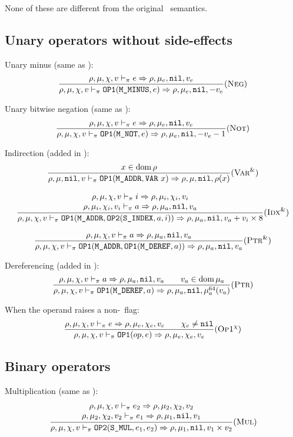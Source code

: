 None of these are different from the original \Cmm\ semantics.

\subsection{Unary operators without side-effects}
Unary minus (same as \Cmm):
\[\dfrac{
    \rho,\mu,\chi,v \vdash_\pi e \Rightarrow \rho,\mu_e,\texttt{nil},v_e
}{\rho,\mu,\chi,v \vdash_\pi \texttt{OP1}(\texttt{M\_MINUS}, e) \Rightarrow \rho,\mu_e,\texttt{nil},-v_e}(\textsc{Neg})\]

Unary bitwise negation (same as \Cmm):
\[\dfrac{
    \rho,\mu,\chi,v \vdash_\pi e\Rightarrow \rho,\mu_e,\texttt{nil},v_e
}{\rho,\mu,\chi,v \vdash_\pi \texttt{OP1}(\texttt{M\_NOT}, e) \Rightarrow \rho,\mu_e,\texttt{nil},-v_e-1}(\textsc{Not})\]


Indirection (added in \Cmp):
\[\dfrac{
    x\in\operatorname{dom}\rho
}{\rho,\mu,\texttt{nil},v \vdash_\pi \texttt{OP1}(\texttt{M\_ADDR}, \texttt{VAR}\ x)\Rightarrow \rho,\mu,\texttt{nil},\rho(x)}(\textsc{Var}^\&)\]

\[\dfrac{\begin{array}{c}
    \rho,\mu,\chi,v \vdash_\pi i\Rightarrow \rho,\mu_i,\chi_i,v_i \\
    \rho,\mu_i,\chi_i,v_i \vdash_\pi a\Rightarrow \rho,\mu_a,\texttt{nil},v_a \\
\end{array}}{\rho,\mu,\chi,v \vdash_\pi \texttt{OP1}(\texttt{M\_ADDR}, \texttt{OP2}(\texttt{S\_INDEX}, a, i)) \Rightarrow \rho,\mu_a,\texttt{nil},v_a+v_i\times 8}(\textsc{Idx}^\&)\]

\[\dfrac{
    \rho,\mu,\chi,v \vdash_\pi a \Rightarrow \rho,\mu_a,\texttt{nil},v_a
}{\rho,\mu,\chi,v \vdash_\pi \texttt{OP1}(\texttt{M\_ADDR}, \texttt{OP1}(\texttt{M\_DEREF}, a)) \Rightarrow \rho,\mu_a,\texttt{nil},v_a}(\textsc{Ptr}^\&)\]

Dereferencing (added in \Cmp):
\[\dfrac{
    \rho,\mu,\chi,v \vdash_\pi a\Rightarrow \rho,\mu_a,\texttt{nil},v_a \qquad v_a\in\operatorname{dom}\mu_a
}{\rho,\mu,\chi,v \vdash_\pi \texttt{OP1}(\texttt{M\_DEREF}, a) \Rightarrow \rho,\mu_a,\texttt{nil},\mu_a^{64}(v_a)}(\textsc{Ptr})\]

When the operand raises a non-\nil\ flag:
\[\dfrac{
    \rho,\mu,\chi,v \vdash_\pi e\Rightarrow \rho,\mu_e,\chi_e,v_e \qquad \chi_e\ne\texttt{nil}
}{\rho,\mu,\chi,v \vdash_\pi \texttt{OP1}(op, e) \Rightarrow \rho,\mu_e,\chi_e,v_e}(\textsc{Op1}^\chi)\]

\subsection{Binary operators}
Multiplication (same as \Cmm):
\[\dfrac{\begin{array}{c}
    \rho,\mu,\chi,v \vdash_\pi e_2\Rightarrow \rho,\mu_2,\chi_2,v_2 \\
    \rho,\mu_2,\chi_2,v_2 \vdash_\pi e_1\Rightarrow \rho,\mu_1,\texttt{nil},v_1
\end{array}}{\rho,\mu,\chi,v \vdash_\pi \texttt{OP2}(\texttt{S\_MUL}, e_1, e_2) \Rightarrow \rho,\mu_1,\texttt{nil},v_1\times v_2}(\textsc{Mul})\]

